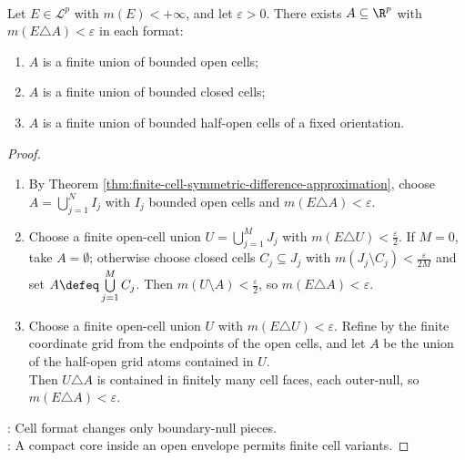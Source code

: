 \begin{corollary} \label{cor:cell-approximation-variant-choices} \\
Let $E\in\mathcal{L}^p$ with $m(E)<+\infty$, and let $\varepsilon>0$. There exists $A\subseteq\R^p$ with $m(E\triangle A)<\varepsilon$ in each format:
\begin{enumerate}[label=(\roman*)]
\setlength{\itemsep}{0pt}
\item $A$ is a finite union of bounded open cells;
\item $A$ is a finite union of bounded closed cells;
\item $A$ is a finite union of bounded half-open cells of a fixed orientation.
\end{enumerate}
\begin{proof}
\begin{enumerate}[label=(\roman*)]
\setlength{\itemsep}{0pt}
\item By Theorem \ref{thm:finite-cell-symmetric-difference-approximation}, choose $A=\bigcup\limits_{j=1}^{N}I_j$ with $I_j$ bounded open cells and $m(E\triangle A)<\varepsilon$.
\item Choose a finite open-cell union $U=\bigcup\limits_{j=1}^{M}J_j$ with $m(E\triangle U)<\frac{\varepsilon}{2}$. If $M=0$, take $A=\emptyset$; otherwise choose closed cells $C_j\subseteq J_j$ with $m(J_j\setminus C_j)<\frac{\varepsilon}{2M}$ and set $A\defeq\bigcup\limits_{j=1}^{M}C_j$. Then $m(U\setminus A)<\frac{\varepsilon}{2}$, so $m(E\triangle A)<\varepsilon$.
\item Choose a finite open-cell union $U$ with $m(E\triangle U)<\varepsilon$. Refine by the finite coordinate grid from the endpoints of the open cells, and let $A$ be the union of the half-open grid atoms contained in $U$.\\
Then $U\triangle A$ is contained in finitely many cell faces, each outer-null, so $m(E\triangle A)<\varepsilon$.
\end{enumerate}
: Cell format changes only boundary-null pieces.\\
: A compact core inside an open envelope permits finite cell variants.
\end{proof}
\end{corollary}

